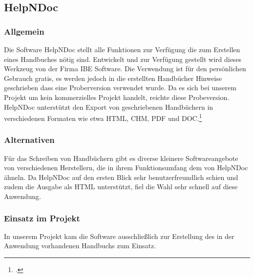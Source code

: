 \subsection{HelpNDoc}
\subsubsection{Allgemein}
Die Software HelpNDoc stellt alle Funktionen zur Verfügung die zum Erstellen eines Handbuches nötig sind. Entwickelt und zur Verfügung gestellt wird dieses Werkzeug von der Firma IBE Software. Die Verwendung ist für den persönlichen Gebrauch gratis, es werden jedoch in die erstellten Handbücher Hinweise geschrieben dass eine Proberversion verwendet wurde. Da es sich bei unserem Projekt um kein kommerzielles Projekt handelt, reichte diese Probeversion.
HelpNDoc unterstützt den Export von geschriebenen Handbüchern in verschiedenen Formaten wie etwa HTML, CHM, PDF und DOC.\footcite[vgl.][]{helpndoc}

\subsubsection{Alternativen}
Für das Schreiben von Handbüchern gibt es diverse kleinere Softwareangebote von verschiedenen Herstellern, die in ihrem Funktionsumfang dem von HelpNDoc ähneln. Da HelpNDoc auf den ersten Blick sehr benutzerfreundlich schien und zudem die Ausgabe als HTML unterstützt, fiel die Wahl sehr schnell auf diese Anwendung.

\subsubsection{Einsatz im Projekt}
In unserem Projekt kam die Software ausschließlich zur Erstellung des in der Anwendung vorhandenen Handbuchs zum Einsatz.
